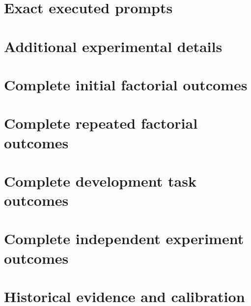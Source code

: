 \section{Exact executed prompts}


\clearpage\section{Additional experimental details}\label{app:experimental-details}

\clearpage\section{Complete initial factorial outcomes}

\clearpage\section{Complete repeated factorial outcomes}

\clearpage\section{Complete development task outcomes}

\clearpage\section{Complete independent experiment outcomes}

\clearpage


\clearpage\section{Historical evidence and calibration}


